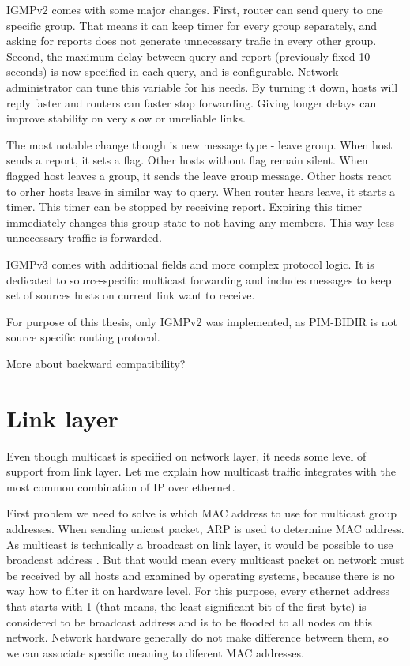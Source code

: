 IGMPv2 \cite{rfc2236} comes with some major changes. First, router can send
query to one specific group. That means it can keep timer for every group
separately, and asking for reports does not generate unnecessary trafic in
every other group. Second, the maximum delay between query and report
(previously fixed 10 seconds) is now specified in each query, and is
configurable. Network administrator can tune this variable for his needs. By
turning it down, hosts will reply faster and routers can faster stop
forwarding. Giving longer delays can improve stability on very slow or
unreliable links.

The most notable change though is new message type - leave group. When host
sends a report, it sets a flag. Other hosts without flag remain silent. When
flagged host leaves a group, it sends the leave group message. Other hosts
react to orher hosts leave in similar way to query. When router hears leave,
it starts a timer. This timer can be stopped by receiving report. Expiring this
timer immediately changes this group state to not having any members. This way
less unnecessary traffic is forwarded.

IGMPv3 comes with additional fields and more complex protocol logic. It is
dedicated to source-specific multicast forwarding and includes messages to keep
set of sources hosts on current link want to receive.

For purpose of this thesis, only IGMPv2 was implemented, as PIM-BIDIR is not
source specific routing protocol.

\TODO More about backward compatibility?

\section{Link layer}

Even though multicast is specified on network layer, it needs some level of
support from link layer. Let me explain how multicast traffic integrates with
the most common combination of IP over ethernet.

First problem we need to solve is which MAC address to use for multicast group
addresses. When sending unicast packet, ARP is used to determine MAC address.
As multicast is technically a broadcast on link layer, it would be possible to
use broadcast address .
But that would mean every multicast packet on network must be received by all
hosts and examined by operating systems, because there is no way how to filter
it on hardware level. For this purpose, every ethernet address that starts with
1 (that means, the least significant bit of the first byte) is considered to be
broadcast address and is to be flooded to all nodes on this network. Network
hardware generally do not make difference between them, so we can associate
specific meaning to diferent MAC addresses.

